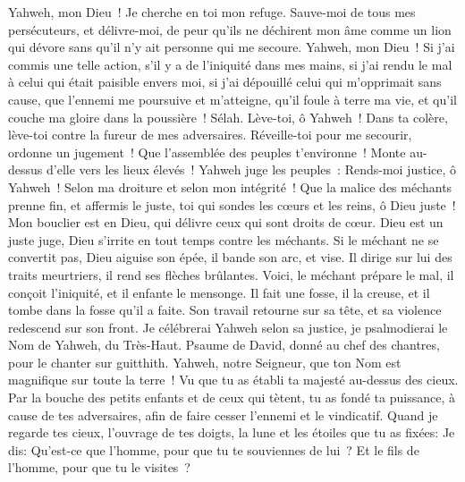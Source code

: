 \begin{multicols}{2}
Yahweh, mon Dieu~! Je cherche en toi mon refuge. Sauve-moi de tous mes persécuteurs, et délivre-moi,
de peur qu'ils ne déchirent mon âme comme un lion qui dévore sans qu'il n'y ait personne qui me secoure.
Yahweh, mon Dieu~! Si j'ai commis une telle action, s'il y a de l'iniquité dans mes mains,
si j'ai rendu le mal à celui qui était paisible envers moi, si j'ai dépouillé celui qui m'opprimait sans cause,
que l'ennemi me poursuive et m'atteigne, qu'il foule à terre ma vie, et qu'il couche ma gloire dans la poussière~! Sélah.
Lève-toi, ô Yahweh~! Dans ta colère, lève-toi contre la fureur de mes adversaires. Réveille-toi pour me secourir, ordonne un jugement~!
Que l'assemblée des peuples t'environne~! Monte au-dessus d'elle vers les lieux élevés~!
Yahweh juge les peuples~: Rends-moi justice, ô Yahweh~! Selon ma droiture et selon mon intégrité~!
Que la malice des méchants prenne fin, et affermis le juste, toi qui sondes les cœurs et les reins, ô Dieu juste~!
Mon bouclier est en Dieu, qui délivre ceux qui sont droits de cœur.
Dieu est un juste juge, Dieu s'irrite en tout temps contre les méchants.
Si le méchant ne se convertit pas, Dieu aiguise son épée, il bande son arc, et vise.
Il dirige sur lui des traits meurtriers, il rend ses flèches brûlantes.
Voici, le méchant prépare le mal, il conçoit l'iniquité, et il enfante le mensonge.
Il fait une fosse, il la creuse, et il tombe dans la fosse qu'il a faite.
Son travail retourne sur sa tête, et sa violence redescend sur son front.
Je célébrerai Yahweh selon sa justice, je psalmodierai le Nom de Yahweh, du Très-Haut.
\VerseOne{}Psaume de David, donné au chef des chantres, pour le chanter sur guitthith.
Yahweh, notre Seigneur, que ton Nom est magnifique sur toute la terre~! Vu que tu as établi ta majesté au-dessus des cieux.
Par la bouche des petits enfants et de ceux qui tètent, tu as fondé ta puissance, à cause de tes adversaires, afin de faire cesser l'ennemi et le vindicatif.
Quand je regarde tes cieux, l'ouvrage de tes doigts, la lune et les étoiles que tu as fixées:
Je dis: Qu'est-ce que l'homme, pour que tu te souviennes de lui~? Et le fils de l'homme, pour que tu le visites~?

\end{multicols}
